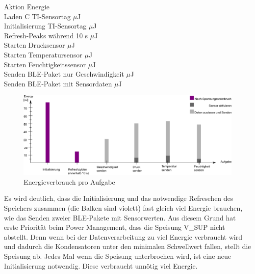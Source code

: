 
\begin{minipage}{\textwidth}
\label{tab_zsm}
\begin{tabbing}
    Aktion \hspace{6cm}                       \quad\= Energie \\[0.8ex]
    Laden C TI-Sensortag             $\mu$J \\
    Initialisierung TI-Sensortag     $\mu$J \\
    Refresh-Peaks während 10 s       $\mu$J \\
    Starten Drucksensor              $\mu$J \\
    Starten Temperatursensor          $\mu$J \\
    Starten Feuchtigkeitssensor      $\mu$J \\
    Senden BLE-Paket nur Geschwindigkeit $\mu$J\\
    Senden BLE-Paket mit Sensordaten    $\mu$J \\
\end{tabbing}
\end{minipage}


\begin{figure}[ht]
  \includegraphics[width=1.0\textwidth]{3Vorgehen/imag/Energy_pro_Aufgabe.png}
  \caption{Energieverbrauch pro Aufgabe}
  \label{energie_zsm}
\end{figure}

Es wird deutlich, dass die Initialisierung und das notwendige Refresehen des Speichers zusammen (die Balken sind violett)  fast gleich viel Energie brauchen, wie das Senden zweier BLE-Pakete mit Sensorwerten. Aus diesem Grund hat erste Priorität beim Power Management, dass die Speisung V\_SUP nicht abstellt. Denn wenn bei der Datenverarbeitung zu viel Energie verbraucht wird und dadurch die Kondensatoren unter den minimalen Schwellwert fallen, stellt die Speisung ab. Jedes Mal wenn die Speisung unterbrochen wird, ist eine neue Initialisierung notwendig. Diese verbraucht unnötig viel Energie.


